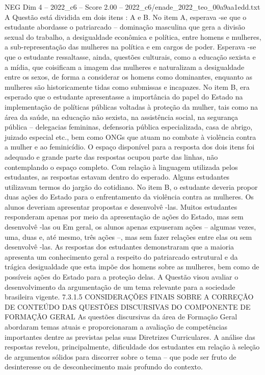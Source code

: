 \begin{textsample}{NEG Dim 4 – 2022\_c6 – Score 2.00 – 2022\_c6/enade\_2022\_teo\_00a9aa1edd.txt}
A Questão está dividida em dois itens : A e B.
No item A, esperava -se que o estudante abordasse o patriarcado – dominação masculina que gera a divisão sexual do trabalho, a desigualdade econômica e política, entre homens e mulheres, a sub-representação das mulheres na política e em cargos de poder.
Esperava -se que o estudante ressaltasse, ainda, questões culturais, como a educação sexista e a mídia, que coisificam a imagem das mulheres e naturalizam a desigualdade entre os sexos, de forma a considerar os homens como dominantes, enquanto as mulheres são historicamente tidas como submissas e incapazes.
No item B, era esperado que o estudante apresentasse a importância do papel do Estado na implementação de políticas públicas voltadas à proteção da mulher, tais como na área da saúde, na educação não sexista, na assistência social, na segurança pública – delegacias femininas, defensoria pública especializada, casa de abrigo, juizado especial etc., bem como ONGs que atuam no combate à violência contra a mulher e ao feminicídio.
O espaço disponível para a resposta dos dois itens foi adequado e grande parte das respostas ocupou parte das linhas, não contemplando o espaço completo.
Com relação à linguagem utilizada pelos estudantes, as respostas estavam dentro do esperado.
Alguns estudantes utilizavam termos do jargão do cotidiano.
No item B, o estudante deveria propor duas ações do Estado para o enfrentamento da violência contra as mulheres.
Os alunos deveriam apresentar propostas e desenvolvê -las.
Muitos estudantes responderam apenas por meio da apresentação de ações do Estado, mas sem desenvolvê -las ou Em geral, os alunos apenas expuseram ações – algumas vezes, uma, duas e, até mesmo, três ações –, mas sem fazer relações entre elas ou sem desenvolvê -las.
As respostas dos estudantes demonstraram que a maioria apresenta um conhecimento geral a respeito do patriarcado estrutural e da trágica desigualdade que esta impõe dos homens sobre as mulheres, bem como de possíveis ações do Estado para a proteção delas.
A Questão visou avaliar o desenvolvimento da argumentação de um tema relevante para a sociedade brasileira vigente. 7.3.1.5 CONSIDERAÇÕES FINAIS SOBRE A CORREÇÃO DE CONTEÚDO DAS QUESTÕES DISCURSIVAS DO COMPONENTE DE FORMAÇÃO GERAL As questões discursivas da área de Formação Geral abordaram temas atuais e proporcionaram a avaliação de competências importantes dentre as previstas pelas suas Diretrizes Curriculares.
A análise das respostas revelou, principalmente, dificuldade dos estudantes em relação à seleção de argumentos sólidos para discorrer sobre o tema – que pode ser fruto de desinteresse ou de desconhecimento mais profundo do contexto.

\end{textsample}
